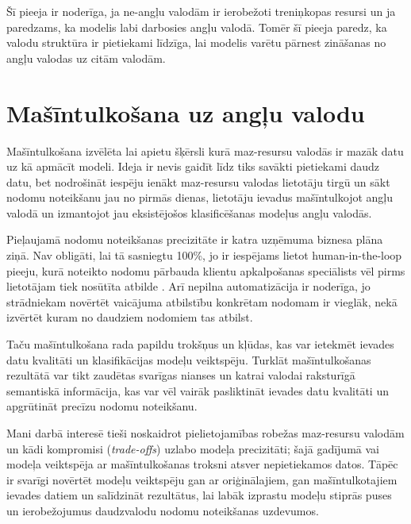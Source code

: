Šī pieeja ir noderīga, ja ne-angļu valodām ir ierobežoti treniņkopas resursi un ja paredzams, ka modelis labi darbosies angļu valodā. 
Tomēr šī pieeja paredz, ka valodu struktūra ir pietiekami līdzīga, lai modelis varētu pārnest zināšanas no angļu valodas uz citām valodām. 


\section{Mašīntulkošana uz angļu valodu}


Mašīntulkošana izvēlēta lai apietu šķērsli kurā maz-resursu valodās ir mazāk datu uz kā apmācīt modeli. Ideja ir nevis gaidīt līdz tiks savākti pietiekami daudz datu, bet nodrošināt iespēju ienākt maz-resursu valodas lietotāju tirgū un sākt nodomu noteikšanu jau no pirmās dienas, lietotāju ievadus mašīntulkojot angļu valodā un izmantojot jau eksistējošos klasificēšanas modeļus angļu valodās. 

Pieļaujamā nodomu noteikšanas precizitāte ir katra uzņēmuma biznesa plāna ziņā. Nav obligāti, lai tā sasniegtu 100\%, jo ir iespējams lietot human-in-the-loop pieeju, kurā noteikto nodomu pārbauda klientu apkalpošanas speciālists vēl pirms lietotājam tiek nosūtīta atbilde \cite{paikens2020}. Arī nepilna automatizācija ir noderīga, jo strādniekam novērtēt vaicājuma atbilstību konkrētam nodomam ir vieglāk, nekā izvērtēt kuram no daudziem nodomiem tas atbilst.

Taču mašīntulkošana rada papildu trokšņus un kļūdas, kas var ietekmēt ievades datu kvalitāti un klasifikācijas modeļu veiktspēju. Turklāt mašīntulkošanas rezultātā var tikt zaudētas svarīgas nianses un katrai valodai raksturīgā semantiskā informācija, kas var vēl vairāk pasliktināt ievades datu kvalitāti un apgrūtināt precīzu nodomu noteikšanu.

Mani darbā interesē tieši noskaidrot pielietojamības robežas maz-resursu valodām un kādi kompromisi (\textit{trade-offs}) uzlabo modeļa precizitāti; šajā gadījumā vai modeļa veiktspēja ar mašīntulkošanas troksni atsver nepietiekamos datos. Tāpēc ir svarīgi novērtēt modeļu veiktspēju gan ar oriģinālajiem, gan mašīntulkotajiem ievades datiem un salīdzināt rezultātus, lai labāk izprastu modeļu stiprās puses un ierobežojumus daudzvalodu nodomu noteikšanas uzdevumos.


